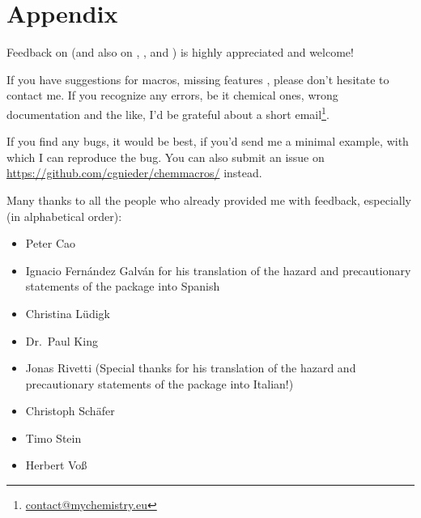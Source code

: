\documentclass[load-preamble+]{cnltx-doc}
\begin{document}
\appendix
\part{Appendix}

Feedback on \chemmacros{} (and also on \chemformula, \chemgreek, and
\ghsystem) is highly appreciated and welcome!

If you have suggestions for macros, missing features \etc, please don't
hesitate to contact me.  If you recognize any errors, be it chemical ones,
wrong documentation and the like, I'd be grateful about a short
email\footnote{\href{mailto:contact@mychemistry.eu}{contact@mychemistry.eu}}.

If you find any bugs, it would be best, if you'd send me a minimal example,
with which I can reproduce the bug.  You can also submit an issue on
\url{https://github.com/cgnieder/chemmacros/} instead.

Many thanks to all the people who already provided me with feedback,
especially (in alphabetical order):
\begin{itemize}
  \item Peter Cao
  \item Ignacio Fernández Galván for his translation of the hazard and
    precautionary statements of the \ghsystem{} package into Spanish
  \item Christina Lüdigk
  \item Dr.~Paul King
  \item Jonas Rivetti (Special thanks for his translation of the hazard and
    precautionary statements of the \ghsystem{} package into Italian!)
  \item Christoph Schäfer
  \item Timo Stein
  \item Herbert Voß
\end{itemize}
\end{document}
